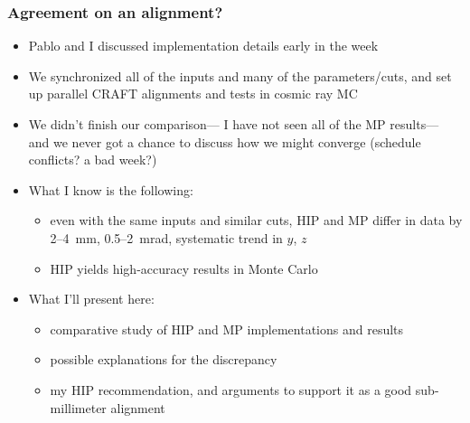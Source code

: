 \documentclass[compress]{beamer}
\begin{document}
\begin{frame}
\frametitle{Agreement on an alignment?}

\begin{itemize}\setlength{\itemsep}{0.1 cm}
\item Pablo and I discussed implementation details  early in the week
\item We synchronized all of the inputs and many of the
  parameters/cuts, and set up parallel CRAFT alignments and tests in
  cosmic ray MC
\item We didn't finish our comparison--- I have not seen all of the
  MP results--- and we never got a chance to discuss how we might
  converge (schedule conflicts? a bad week?)
\item What I know is the following:
\begin{itemize}\setlength{\itemsep}{0.1 cm}
\item even with the same inputs and similar cuts, HIP and MP differ in
  data by 2--4~mm, 0.5--2~mrad, systematic trend in $y$, $z$
\item HIP yields high-accuracy results in Monte Carlo
\end{itemize}
\item What I'll present here:
\begin{itemize}
\item comparative study of HIP and MP implementations and results
\item possible explanations for the discrepancy
\item my HIP recommendation, and arguments to support it as a good sub-millimeter alignment
\end{itemize}
\end{itemize}
\end{frame}


\end{document}
